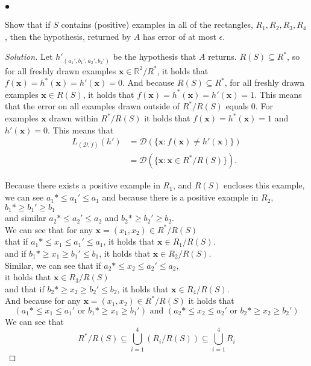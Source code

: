 \documentclass[10pt, a4paper, twoside]{amsart}
\newcommand{\R}{\ensuremath{\mathbb{R}}}
\newenvironment{solution}
               {\let\oldqedsymbol=\qedsymbol
                \renewcommand{\qedsymbol}{$\blacktriangleleft$}
                \begin{proof}[Solution]}
               {\end{proof}
                \renewcommand{\qedsymbol}{\oldqedsymbol}}
\newcommand{\TODO}{\textcolor{red}{\textbf{!!!!!! }}}
\begin{document}
\subsubsection*{$\bullet$}


Show that if $S$ contains (positive) examples in all of the rectangles, $R_1, R_2, R_3, R_4$, then the hypothesis, returned by $A$ has error of at most $\epsilon$. 

\begin{solution}
  Let $h'_{(a_1',b_1',a_2',b_2')}$ be the hypothesis that $A$ returns. $R(S)\subseteq R^*$, so for all freshly drawn examples $\mathbf{x} \in \R^2/R^*$,  it holds that $f(\mathbf{x})=h^*(\mathbf{x}) = h'(\mathbf{x}) = 0$. And because $R(S)\subseteq R^*$, for all freshly drawn examples $\mathbf{x} \in R(S)$, it holds that $f(\mathbf{x})=h^*(\mathbf{x}) = h'(\mathbf{x}) = 1$. This means that the error on all examples drawn outside of $R^*/R(S)$ equals $0$. For examples $\mathbf{x}$ drawn within $R^*/R(S)$ it holds that $f(\mathbf{x})=h^*(\mathbf{x}) = 1$ and $h'(\mathbf{x}) = 0$. This means that
  \begin{align*}
  L_{(\mathcal{D},f)}(h') &= \mathcal{D}(\{\mathbf{x}: f(\mathbf{x}) \neq h'(\mathbf{x})\}) \\
                          &= \mathcal{D}(\{\mathbf{x}:\mathbf{x}\in R^*/R(S)\}).
  \end{align*}


  Because there exists a positive example in $R_1$, and $R(S)$ encloses this example, we can see $a_1* \leq a_1' \leq a_1$ and 
  because there is a positive example in $R_2$, $b_1* \geq b_1' \geq b_1$ \\
  and similar $a_2* \leq a_2' \leq a_2$ and $b_2* \geq b_2' \geq b_2$. \\
  We can see that for any $\mathbf{x} = (x_1,x_2) \in R^*/R(S)$\\
  that if $a_1* \leq x_1 \leq a_1' \leq a_1$, it holds that $\mathbf{x} \in R_1/R(S)$.\\
  and if $b_1* \geq x_1 \geq b_1' \leq b_1$, it holds that $\mathbf{x} \in R_2/R(S)$.\\
  Similar, we can see that if  $a_2* \leq x_2 \leq a_2' \leq a_2$,\\
  it holds that $\mathbf{x} \in R_3/R(S)$\\
  and that if $b_2* \geq x_2 \geq b_2' \leq b_2$, it holds that $\mathbf{x} \in R_4/R(S)$.\\
  And because for any $\mathbf{x} = (x_1,x_2) \in R^*/R(S)$ it holds that
\begin{equation*}
  (a_1* \leq x_1 \leq a_1' \text{ or } b_1* \geq x_1 \geq b_1') \text{ and } (a_2* \leq x_2 \leq a_2' \text{ or  } b_2* \geq x_2 \geq b_2')
\end{equation*}
We can see that
\begin{equation*}
R^*/R(S) \subseteq \bigcup_{i=1}^4(R_i/R(S)) \subseteq \bigcup_{i=1}^4R_i
\end{equation*}
  

\end{solution}
\end{document}
